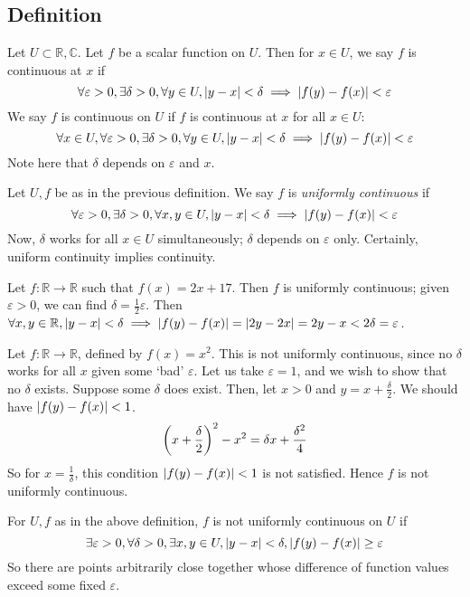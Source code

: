 \subsection{Definition}
Let \( U \subset \mathbb R, \mathbb C \).
Let \( f \) be a scalar function on \( U \).
Then for \( x \in U \), we say \( f \) is continuous at \( x \) if
\[
	\forall \varepsilon > 0, \exists \delta > 0, \forall y \in U, \abs{y-x} < \delta \implies \abs{f(y)-f(x)} < \varepsilon
\]
We say \( f \) is continuous on \( U \) if \( f \) is continuous at \( x \) for all \( x \in U \):
\[
	\forall x \in U, \forall \varepsilon > 0, \exists \delta > 0, \forall y \in U, \abs{y-x} < \delta \implies \abs{f(y)-f(x)} < \varepsilon
\]
Note here that \( \delta \) depends on \( \varepsilon \) and \( x \).
\begin{definition}
	Let \( U, f \) be as in the previous definition.
	We say \( f \) is \textit{uniformly continuous} if
	\[
		\forall \varepsilon > 0, \exists \delta > 0, \forall x, y \in U, \abs{y-x} < \delta \implies \abs{f(y) - f(x)} < \varepsilon
	\]
	Now, \( \delta \) works for all \( x \in U \) simultaneously; \( \delta \) depends on \( \varepsilon \) only.
	Certainly, uniform continuity implies continuity.
\end{definition}
\begin{example}
	Let \( f \colon \mathbb R \to \mathbb R \) such that \( f(x) = 2x + 17 \).
	Then \( f \) is uniformly continuous; given \( \varepsilon > 0 \), we can find \( \delta = \frac{1}{2} \varepsilon \).
	Then \( \forall x, y \in \mathbb R, \abs{y-x} < \delta \implies \abs{f(y)-f(x)} = \abs{2y-2x} = 2{y-x} < 2 \delta = \varepsilon \).
\end{example}
\begin{example}
	Let \( f \colon \mathbb R \to \mathbb R \), defined by \( f(x) = x^2 \).
	This is not uniformly continuous, since no \( \delta \) works for all \( x \) given some `bad' \( \varepsilon \).
	Let us take \( \varepsilon = 1 \), and we wish to show that no \( \delta \) exists.
	Suppose some \( \delta \) does exist.
	Then, let \( x > 0 \) and \( y = x + \frac{\delta}{2} \).
	We should have \( \abs{f(y) - f(x)} < 1 \).
	\[
		\qty(x + \frac{\delta}{2})^2 - x^2 = \delta x + \frac{\delta^2}{4}
	\]
	So for \( x = \frac{1}{\delta} \), this condition \( \abs{f(y) - f(x)} < 1 \) is not satisfied.
	Hence \( f \) is not uniformly continuous.
\end{example}
\begin{note}
	For \( U, f \) as in the above definition, \( f \) is not uniformly continuous on \( U \) if
	\[
		\exists \varepsilon > 0, \forall \delta > 0, \exists x, y \in U, \abs{y-x} < \delta, \abs{f(y) - f(x)} \geq \varepsilon
	\]
	So there are points arbitrarily close together whose difference of function values exceed some fixed \( \varepsilon \).
\end{note}

